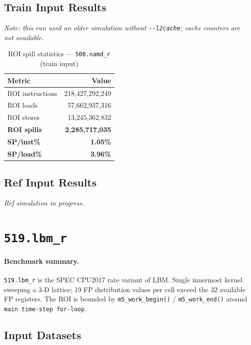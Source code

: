 \documentclass[11pt,a4paper]{article}
\begin{document}
\subsection{Train Input Results}

\textit{Note: this run used an older simulation without \texttt{-{}-l2cache}; cache counters are not available.}


\begin{table}[H]
\centering
\caption{ROI spill statistics --- \texttt{508.namd\_r} (train input)}
\label{tab:namd_train_roi}
\begin{tabular}{lr}
\toprule
\textbf{Metric} & \textbf{Value} \\
\midrule
ROI instructions & 218,427,292,249 \\
ROI loads        & 57,662,937,316 \\
ROI stores       & 13,245,362,832 \\
\textbf{ROI spills}   & \textbf{2,285,717,035} \\
\textbf{SP/inst\%}   & \textbf{1.05\%} \\
\textbf{SP/load\%}   & \textbf{3.96\%} \\
\bottomrule
\end{tabular}
\end{table}

\subsection{Ref Input Results}
\textit{Ref simulation in progress.}



\section{\texttt{519.lbm\_r}}
\label{sec:lbm}

\paragraph{Benchmark summary.}
\texttt{519.lbm\_r} is the SPEC CPU2017 rate variant of LBM.
Single innermost kernel sweeping a 3-D lattice; 19 FP distribution values per cell exceed the 32 available FP registers.
The ROI is bounded by \texttt{m5\_work\_begin()} / \texttt{m5\_work\_end()}
around \texttt{main time-step for-loop}.

\subsection{Input Datasets}
\end{document}
